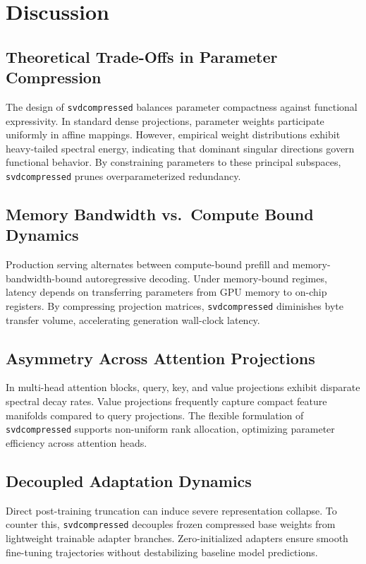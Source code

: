 \section{Discussion}

\subsection{Theoretical Trade-Offs in Parameter Compression}
The design of \texttt{svdcompressed} balances parameter compactness against functional expressivity. In standard dense projections, parameter weights participate uniformly in affine mappings. However, empirical weight distributions exhibit heavy-tailed spectral energy, indicating that dominant singular directions govern functional behavior. By constraining parameters to these principal subspaces, \texttt{svdcompressed} prunes overparameterized redundancy.

\subsection{Memory Bandwidth vs.\ Compute Bound Dynamics}
Production serving alternates between compute-bound prefill and memory-bandwidth-bound autoregressive decoding. Under memory-bound regimes, latency depends on transferring parameters from GPU memory to on-chip registers. By compressing projection matrices, \texttt{svdcompressed} diminishes byte transfer volume, accelerating generation wall-clock latency.

\subsection{Asymmetry Across Attention Projections}
In multi-head attention blocks, query, key, and value projections exhibit disparate spectral decay rates. Value projections frequently capture compact feature manifolds compared to query projections. The flexible formulation of \texttt{svdcompressed} supports non-uniform rank allocation, optimizing parameter efficiency across attention heads.

\subsection{Decoupled Adaptation Dynamics}
Direct post-training truncation can induce severe representation collapse. To counter this, \texttt{svdcompressed} decouples frozen compressed base weights from lightweight trainable adapter branches. Zero-initialized adapters ensure smooth fine-tuning trajectories without destabilizing baseline model predictions.

